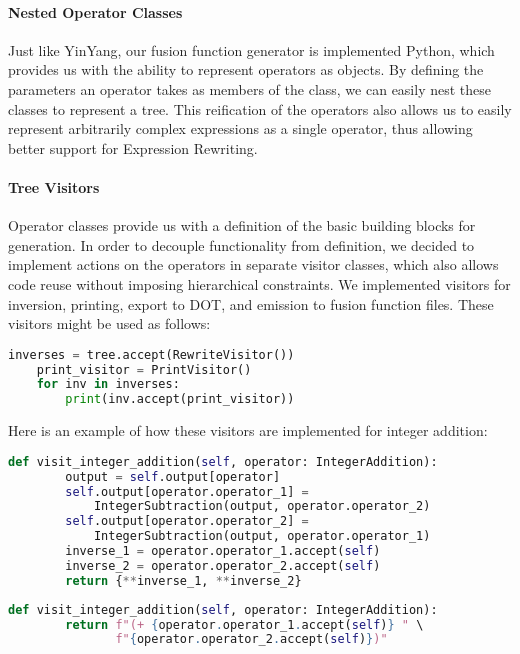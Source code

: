 \documentclass[sigplan,screen]{acmart}
\begin{document}
\paragraph{Nested Operator Classes}
Just like YinYang, our fusion function generator is implemented Python, which provides us with the ability to represent operators as objects. By defining the parameters an operator takes as members of the class, we can easily nest these classes to represent a tree. This reification of the operators also allows us to easily represent arbitrarily complex expressions as a single operator, thus allowing better support for Expression Rewriting.

\paragraph{Tree Visitors}
Operator classes provide us with a definition of the basic building blocks for generation. In order to decouple functionality from definition, we decided to implement actions on the operators in separate visitor classes, which also allows code reuse without imposing hierarchical constraints. We implemented visitors for inversion, printing, export to DOT, and emission to fusion function files. These visitors might be used as follows:

\begin{lstlisting}[language=Python, basicstyle=\tiny]
    inverses = tree.accept(RewriteVisitor())
    print_visitor = PrintVisitor()
    for inv in inverses:
        print(inv.accept(print_visitor))
\end{lstlisting}

Here is an example of how these visitors are implemented for integer addition:

\begin{lstlisting}[language=Python, basicstyle=\tiny, title={RewriteVisitor}, captionpos=b]
    def visit_integer_addition(self, operator: IntegerAddition):
        output = self.output[operator]
        self.output[operator.operator_1] =
            IntegerSubtraction(output, operator.operator_2)
        self.output[operator.operator_2] =
            IntegerSubtraction(output, operator.operator_1)
        inverse_1 = operator.operator_1.accept(self)
        inverse_2 = operator.operator_2.accept(self)
        return {**inverse_1, **inverse_2}
\end{lstlisting}

\begin{lstlisting}[language=Python, basicstyle=\tiny, title={PrintVisitor}, captionpos=b]
    def visit_integer_addition(self, operator: IntegerAddition):
        return f"(+ {operator.operator_1.accept(self)} " \
               f"{operator.operator_2.accept(self)})"
\end{lstlisting}
\end{document}
